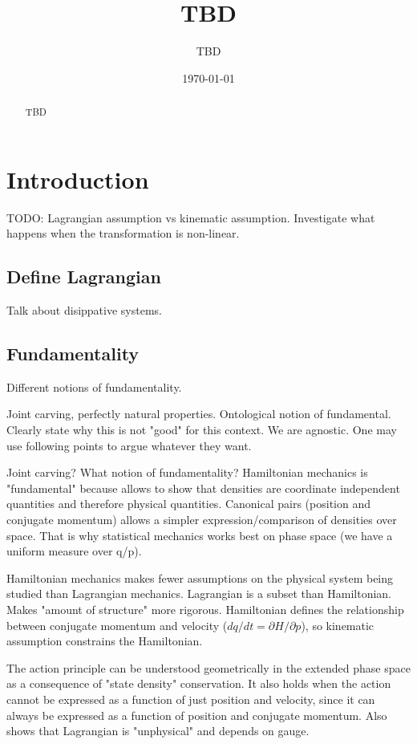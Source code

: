 \documentclass[letterpaper]{article}
\begin{document}
\title{TBD}
\author{TBD}

\date{\today}

\maketitle

\begin{abstract}
	TBD
\end{abstract}


\section{Introduction}

TODO: Lagrangian assumption vs kinematic assumption. Investigate what happens when the transformation is non-linear.

\subsection{Define Lagrangian}

Talk about disippative systems.

\subsection{Fundamentality}

Different notions of fundamentality.

Joint carving, perfectly natural properties. Ontological notion of fundamental. Clearly state why this is not "good" for this context. We are agnostic. One may use following points to argue whatever they want.

Joint carving? What notion of fundamentality? Hamiltonian mechanics is "fundamental" because allows to show that densities are coordinate independent quantities and therefore physical quantities. Canonical pairs (position and conjugate momentum) allows a simpler expression/comparison of densities over space. That is why statistical mechanics works best on phase space (we have a uniform measure over q/p).

Hamiltonian mechanics makes fewer assumptions on the physical system being studied than Lagrangian mechanics. Lagrangian is a subset than Hamiltonian. Makes "amount of structure" more rigorous. Hamiltonian defines the relationship between conjugate momentum and velocity ($dq/dt = \partial H / \partial p$), so kinematic assumption constrains the Hamiltonian.

The action principle can be understood geometrically in the extended phase space as a consequence of "state density" conservation. It also holds when the action cannot be expressed as a function of just position and velocity, since it can always be expressed as a function of position and conjugate momentum. Also shows that Lagrangian is "unphysical" and depends on gauge.
 




\end{document}
